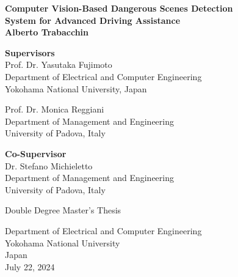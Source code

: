 \begin{titlepage}
\begin{center}

\vspace*{0.5cm}
\textbf{\Large{Computer Vision-Based Dangerous Scenes Detection}\\ 
        \vspace*{0.2cm}
        \Large{System for Advanced Driving Assistance}}\\
\vspace*{2cm}
\textbf{\large{Alberto Trabacchin}}\\
\vfill

\vspace*{1cm}

\begin{flushright}
\textbf{Supervisors} \\
\vspace*{0.5cm}
Prof. Dr. Yasutaka Fujimoto \\
Department of Electrical and Computer Engineering \\
Yokohama National University, Japan

\vspace*{0.5cm}

Prof. Dr. Monica Reggiani \\
Department of Management and Engineering \\
University of Padova, Italy

\vspace*{1cm}

\textbf{Co-Supervisor} \\
\vspace*{0.5cm}
Dr. Stefano Michieletto \\
Department of Management and Engineering \\
University of Padova, Italy
\end{flushright}

\vfill

Double Degree Master's Thesis\\
    
\vspace{0.8cm}

    
Department of Electrical and Computer Engineering\\
Yokohama National University\\
Japan\\
July 22, 2024
            
\end{center}
\end{titlepage}

\afterpage{\blankpage}